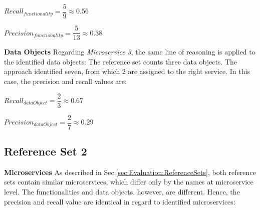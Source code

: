 \hspace{1cm}
\noindent
\begin{minipage}{.4\linewidth}
	\vspace{0.5cm}
	\flushleft
	
	
	$Recall_{functionality}=\dfrac{5}{9} \approx 0.56  $
	\vspace{0.5cm}
	
\end{minipage}%
\begin{minipage}{.5\linewidth}
	\vspace{0.5cm}
	\flushleft
	
	
	$Precision_{functionality}=\dfrac{5}{13} \approx 0.38  $
	\vspace{0.5cm}
	
\end{minipage}



\noindent
\textbf{Data Objects} Regarding \textit{Microservice 3}, the same line of reasoning is applied to the identified data objects: The reference set counts three data objects. The approach identified seven, from which 2 are assigned to the right service. In this case, the precision and recall values are:


\hspace{1cm}
\noindent
\begin{minipage}{.4\linewidth}
	\vspace{0.5cm}
	\flushleft
	
	
	$Recall_{dataObject}=\dfrac{2}{3} \approx 0.67  $
	\vspace{0.5cm}
	
\end{minipage}%
\begin{minipage}{.5\linewidth}
	\vspace{0.5cm}
	\flushleft
	
	
	$Precision_{dataObject}=\dfrac{2}{7} \approx 0.29  $
	\vspace{0.5cm}
	
\end{minipage}





\subsection{Reference Set 2}



\textbf{Microservices} As described in Sec.\ref{sec:Evaluation:ReferenceSets}, both reference sets contain similar microservices, which differ only by the names at microservice level. The functionalities and data objects, however, are different. Hence, the precision and recall value are identical in regard to identified microservices:


